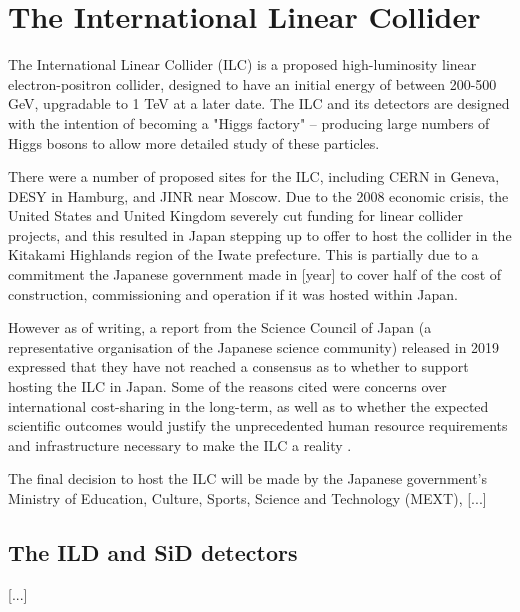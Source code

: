 
\section{The International Linear Collider}

The International Linear Collider (ILC) is a proposed high-luminosity linear electron-positron collider, designed to have an initial energy of between 200-500 GeV, upgradable to 1 TeV at a later date. The ILC and its detectors are designed with the intention of becoming a "Higgs factory" -- producing large numbers of Higgs bosons to allow more detailed study of these particles.

There were a number of proposed sites for the ILC, including CERN in Geneva, DESY in Hamburg, and JINR near Moscow. Due to the 2008 economic crisis, the United States and United Kingdom severely cut funding for linear collider projects, and this resulted in Japan stepping up to offer to host the collider in the Kitakami Highlands region of the Iwate prefecture. This is partially due to a commitment the Japanese government made in [year] to cover half of the cost of construction, commissioning and operation if it was hosted within Japan.

However as of writing, a report from the Science Council of Japan (a representative organisation of the Japanese science community) released in 2019 expressed that they have not reached a consensus as to whether to support hosting the ILC in Japan. Some  of the reasons cited were concerns over international cost-sharing in the long-term, as well as to whether the expected scientific outcomes would justify the unprecedented human resource requirements and infrastructure necessary to make the ILC a reality \cite{linearcolliders-scj-report}.

The final decision to host the ILC will be made by the Japanese government's Ministry of Education, Culture, Sports, Science and Technology (MEXT), [...]

\subsection{The ILD and SiD detectors}
[...]

